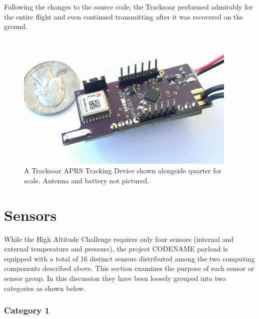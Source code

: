 \documentclass[english]{report}
\begin{document}
Following the changes to the source code, the Tracksoar performed admirably for the entire flight and even continued transmitting after it was recovered on the ground.



\begin{figure}[H]
\begin{centering}
\includegraphics{./images/tracksoar}
\par\end{centering}
\caption{A Tracksoar APRS Tracking Device shown alongside quarter for scale. Antenna and battery not pictured.}
\end{figure}


\pagebreak
\section{Sensors}


While the High Altitude Challenge requires only four sensors (internal
and external temperature and pressure), the project CODENAME payload
is equipped with a total of 16 distinct sensors distributed among
the two computing components described above. This section examines
the purpose of each sensor or sensor group.  In this discussion they have been loosely grouped into two categories
as shown below\@.

\subsubsection*{Category 1}
\end{document}
